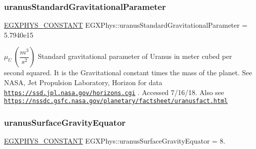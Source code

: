 \subsubsection{\texorpdfstring{uranus\+Standard\+Gravitational\+Parameter}{uranusStandardGravitationalParameter}}
{\footnotesize\ttfamily \mbox{\hyperlink{group___e_g_x_phys-_constants-_macros_ga76980d288494ce1714c9ac68a95ba702}{E\+G\+X\+P\+H\+Y\+S\+\_\+\+C\+O\+N\+S\+T\+A\+NT}} E\+G\+X\+Phys\+::uranus\+Standard\+Gravitational\+Parameter = 5.\+7940e15}

$ \mu_{U} \ (\dfrac{m^3}{s^2})$ Standard gravitational parameter of Uranus in meter cubed per second squared. It is the Gravitational constant times the mass of the planet. See N\+A\+SA, Jet Propulsion Laboratory, Horizon for data \href{https://ssd.jpl.nasa.gov/horizons.cgi}{\tt https\+://ssd.\+jpl.\+nasa.\+gov/horizons.\+cgi} . Accessed 7/16/18. Also see \href{https://nssdc.gsfc.nasa.gov/planetary/factsheet/uranusfact.html}{\tt https\+://nssdc.\+gsfc.\+nasa.\+gov/planetary/factsheet/uranusfact.\+html} \mbox{\label{group___e_g_x_phys-_constants-_astrophysics-_solar_system-_uranus-_bulk_gaf69b423e76cf2feda0f1ea87eedc698b}} 
\subsubsection{\texorpdfstring{uranus\+Surface\+Gravity\+Equator}{uranusSurfaceGravityEquator}}
{\footnotesize\ttfamily \mbox{\hyperlink{group___e_g_x_phys-_constants-_macros_ga76980d288494ce1714c9ac68a95ba702}{E\+G\+X\+P\+H\+Y\+S\+\_\+\+C\+O\+N\+S\+T\+A\+NT}} E\+G\+X\+Phys\+::uranus\+Surface\+Gravity\+Equator = 8.}

